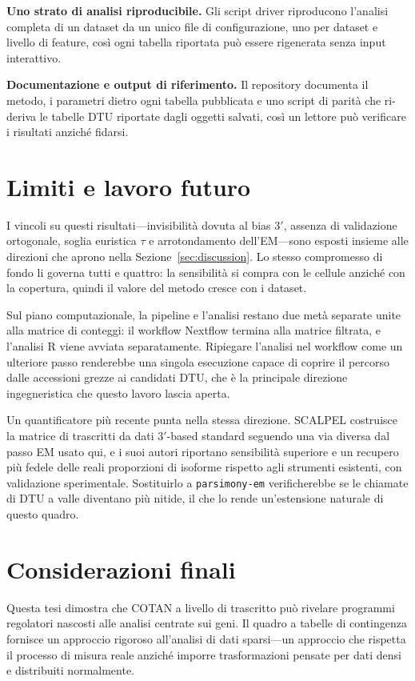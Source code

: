 \textbf{Uno strato di analisi riproducibile.} Gli script driver riproducono l'analisi completa di un dataset da un unico file di configurazione, uno per dataset e livello di feature, così ogni tabella riportata può essere rigenerata senza input interattivo.

\textbf{Documentazione e output di riferimento.} Il repository documenta il metodo, i parametri dietro ogni tabella pubblicata e uno script di parità che ri-deriva le tabelle DTU riportate dagli oggetti salvati, così un lettore può verificare i risultati anziché fidarsi.

\section{Limiti e lavoro futuro}

I vincoli su questi risultati---invisibilità dovuta al bias $3'$, assenza di validazione ortogonale, soglia euristica $\tau$ e arrotondamento dell'EM---sono esposti insieme alle direzioni che aprono nella Sezione~\ref{sec:discussion}. Lo stesso compromesso di fondo li governa tutti e quattro: la sensibilità si compra con le cellule anziché con la copertura, quindi il valore del metodo cresce con i dataset.

Sul piano computazionale, la pipeline e l'analisi restano due metà separate unite alla matrice di conteggi: il workflow Nextflow termina alla matrice filtrata, e l'analisi R viene avviata separatamente. Ripiegare l'analisi nel workflow come un ulteriore passo renderebbe una singola esecuzione capace di coprire il percorso dalle accessioni grezze ai candidati DTU, che è la principale direzione ingegneristica che questo lavoro lascia aperta.

Un quantificatore più recente punta nella stessa direzione. SCALPEL\cite{ake2025scalpel} costruisce la matrice di trascritti da dati $3'$-based standard seguendo una via diversa dal passo EM usato qui, e i suoi autori riportano sensibilità superiore e un recupero più fedele delle reali proporzioni di isoforme rispetto agli strumenti esistenti, con validazione sperimentale. Sostituirlo a \texttt{parsimony-em} verificherebbe se le chiamate di DTU a valle diventano più nitide, il che lo rende un'estensione naturale di questo quadro.

\section*{Considerazioni finali}

Questa tesi dimostra che COTAN a livello di trascritto può rivelare programmi regolatori nascosti alle analisi centrate sui geni. Il quadro a tabelle di contingenza fornisce un approccio rigoroso all'analisi di dati sparsi---un approccio che rispetta il processo di misura reale anziché imporre trasformazioni pensate per dati densi e distribuiti normalmente.

